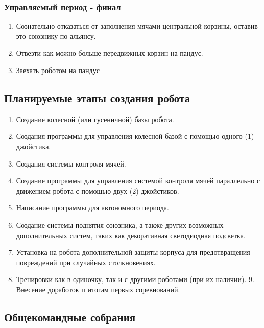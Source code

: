 \documentclass[12pt]{article}
\begin{document}
	      \subsubsection{Управляемый период - финал}
	      \begin{enumerate}
	      \item Сознательно отказаться от заполнения мячами центральной корзины, оставив это союзнику по альянсу.
	      \item Отвезти как можно больше передвижных корзин на пандус.
	      \item Заехать роботом на пандус 
	      \end{enumerate}
	      \subsection{Планируемые этапы создания робота}
	      \begin{enumerate}
	      	\item Создание колесной (или гусеничной) базы робота.
	      	\item Создания программы для управления колесной базой с помощью одного (1) джойстика.
	      	\item Создания системы контроля мячей.
	      	\item Создание программы для управления системой контроля мячей параллельно с движением робота с помощью двух (2) джойстиков.
	      	\item Написание программы для автономного периода.
	      	\item Создание системы поднятия союзника, а также других возможных дополнительных систем, таких как декоративная светодиодная подсветка.
	      	\item Установка на робота дополнительной защиты корпуса для предотвращения повреждений при случайных столкновениях.
	      	\item Тренировки как в одиночку, так и с другими роботами (при их наличии).
	      	9.	Внесение доработок п итогам первых соревнований.
	      \end{enumerate}
	      \newpage
	      \subsection{Общекомандные собрания}
\end{document}
